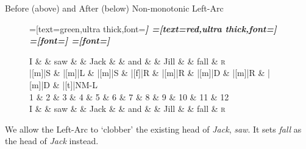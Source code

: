 \documentclass{lecture}
\begin{document}
\begin{plain}{Before (above) and After (below) Non-monotonic Left-Arc}


\begin{figure}
    \centering
    \begin{dependency}[theme=simple]
        =[text=green,ultra thick,font=\bfseries\itshape]
        =[text=red,ultra thick,font=\bfseries\itshape]
        =[font=\bfseries\itshape]
        =[font=\itshape]

        \begin{deptext}[column sep=.075cm, row sep=.1ex]
            I \&           \& saw \&          \& Jack       \& \& and     \&           \& Jill   \&  \& fall \& \textsc{r} \\
|[m]|S \& |[m]|L \& |[m]|S   \& |[f]|R \& |[m]|R \& |[m]|D \& |[m]|R \& |[m]|D \& |[t]|NM-L \\
    1 \&     2       \& 3  \&   4      \& 5          \& 6 \& 7     \& 8 \& 9 \& 10 \& 11 \& 12 \\
    I \&           \& saw \&          \& Jack       \& \& and     \&           \& Jill   \&      \& fall \& \textsc{r} \\
        \end{deptext}
    
    
\end{dependency}
\end{figure}

We allow the Left-Arc to `clobber' the existing head of \emph{Jack},  \emph{saw}.
It sets \emph{fall} as the head of \emph{Jack} instead. 

\end{plain}
\end{document}
